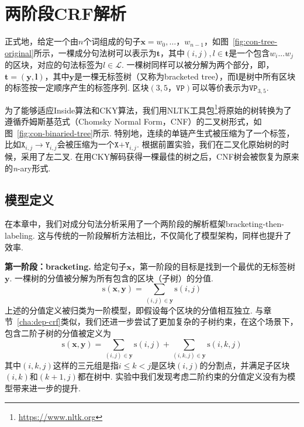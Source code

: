 \section{两阶段CRF解析}\label{sec:2stage-parsing}

正式地，给定一个由$n$个词组成的句子$\boldsymbol{x}=w_0,\dots，w_{n-1}$，如图~\ref{fig:con-tree-original}所示，一棵成分句法树可以表示为$\boldsymbol{t}$，其中$(i,j),l \in \boldsymbol{t}$是一个包含$w_{i}...w_{j}$的区块，对应的句法标签为$l \in \mathcal{L}$.
一棵树同样可以被分解为两个部分，即，$\boldsymbol{t}=(\boldsymbol{y}, \boldsymbol{l})$，其中$\boldsymbol{y}$是一棵无标签树（又称为bracketed tree），而$\boldsymbol{l}$是树中所有区块的标签按一定顺序产生的标签序列.
区块$(3,5，\texttt{VP})$可以等价表示为$\texttt{VP}_{3,5}$.

为了能够适应Inside算法和CKY算法，我们用NLTK工具包\footnote{\url{https://www.nltk.org}}将原始的树转换为了遵循乔姆斯基范式（Chomsky Normal Form，CNF）的二叉树形式，如图~\ref{fig:con-binaried-tree}所示.
特别地，连续的单链产生式被压缩为了一个标签，比如$\texttt{X}_{i,j} \rightarrow \texttt{Y}_{i,j}$会被压缩为一个$\texttt{X+Y}_{i,j}$.
根据前置实验，我们在二叉化原始树的时候，采用了左二叉.
在用CKY解码获得一棵最佳的树之后，CNF树会被恢复为原来的\textit{n}-ary形式.

\subsection{模型定义}\label{sub@sec:con-crf-model-definition}

在本章中，我们对成分句法分析采用了一个两阶段的解析框架bracketing-then-labeling.
这与传统的一阶段解析方法\citep{stern-etal-2017-minimal,gaddy-etal-2018-whats}相比，不仅简化了模型架构，同样也提升了效率.

\noindent\textbf{第一阶段：bracketing.}
给定句子$\boldsymbol{x}$，第一阶段的目标是找到一个最优的无标签树$\boldsymbol{y}$.
一棵树的分值被分解为所有包含的区块（子树）的分值.
\begin{equation} \label{eq:tree-score}
  \mathrm{s}(\boldsymbol{x},\boldsymbol{y}) = \sum\limits_{(i,j)\in \boldsymbol{y}}\mathrm{s}(i,j)
\end{equation}
上述的分值定义被归类为一阶模型，即假设每个区块的分值相互独立.
与章节~\ref{cha:dep-crf}类似，我们还进一步尝试了更加复杂的子树约束，在这个场景下，包含二阶子树的分值被定义为
\begin{equation} \label{eq:2ostree-score}
  \mathrm{s}(\boldsymbol{x},\boldsymbol{y}) = \sum\limits_{(i,j)\in \boldsymbol{y}}\mathrm{s}(i,j)+\sum\limits_{(i,k,j)\in \boldsymbol{y}}\mathrm{s}(i,k,j)
\end{equation}
其中$(i,k,j)$这样的三元组是指$i \leq k < j$是区块$(i,j)$的分割点，并满足子区块$(i,k)$和$(k+1,j)$都在树中.
实验中我们发现考虑二阶约束的分值定义没有为模型带来进一步的提升.

